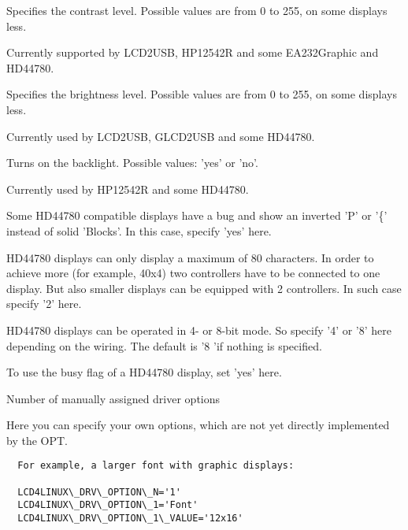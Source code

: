 \begin{description}
  Specifies the contrast level. Possible values are from 0 to 255, on some displays less.

  Currently supported by LCD2USB, HP12542R and some EA232Graphic and HD44780.  
  

  Specifies the brightness level. Possible values are from 0 to 255, on some displays less.

  Currently used by LCD2USB, GLCD2USB and some HD44780.
  

  Turns on the backlight. Possible values: 'yes' or 'no'.

  Currently used by HP12542R and some HD44780.


  Some HD44780 compatible displays have a bug and show an inverted 'P' or '\{' instead of
  solid 'Blocks'. In this case, specify 'yes' here.

  HD44780 displays can only display a maximum of 80 characters. In order to achieve more (for example, 40x4)
  two controllers have to be connected to one display. But also smaller displays can be equipped with 2 controllers.
  In such case specify '2' here.
  

  HD44780 displays can be operated in 4- or 8-bit mode. So specify '4' or '8' here depending on the wiring.
  The default is '8 'if nothing is specified.


  To use the busy flag of a HD44780 display, set 'yes' here.
  

  Number of manually assigned driver options
  

  Here you can specify your own options, which are not yet directly implemented by the OPT.

\begin{example}
\begin{verbatim}
  For example, a larger font with graphic displays:

  LCD4LINUX\_DRV\_OPTION\_N='1'
  LCD4LINUX\_DRV\_OPTION\_1='Font'
  LCD4LINUX\_DRV\_OPTION\_1\_VALUE='12x16'

\end{verbatim}
\end{example}

\end{description}

